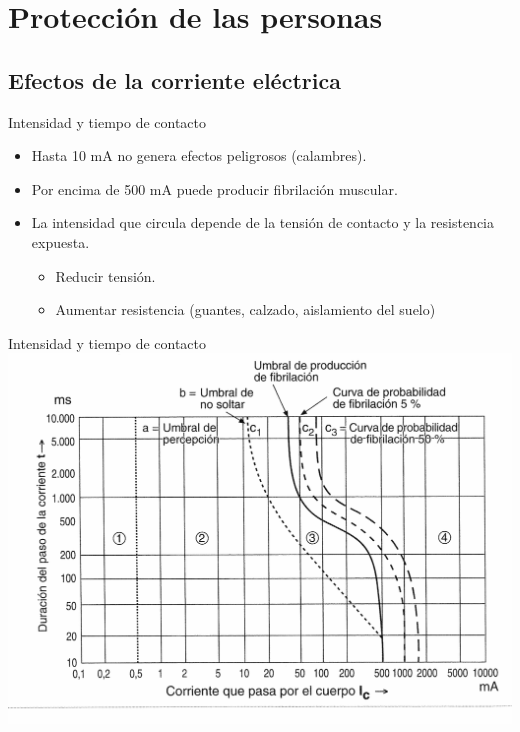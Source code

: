 \documentclass[xcolor={usenames,svgnames,dvipsnames}]{beamer}
\begin{document}
\section{Protección de las personas}
\label{sec-2}

\subsection{Efectos de la corriente eléctrica}
\label{sec-2-1}

\begin{frame}[label=sec-2-1-1]{Intensidad y tiempo de contacto}
\begin{itemize}
\item Hasta 10 mA no genera efectos peligrosos (calambres).

\item Por encima de 500 mA puede producir fibrilación muscular.

\item La \alert{intensidad} que circula \alert{depende de la tensión de contacto y la
resistencia expuesta}.

\begin{itemize}
\item Reducir tensión.

\item Aumentar resistencia (guantes, calzado, aislamiento del suelo)
\end{itemize}
\end{itemize}
\end{frame}

\begin{frame}[label=sec-2-1-2]{Intensidad y tiempo de contacto}
\includegraphics[width=.9\linewidth]{../figs/CurvaIntensidadContactoTiempo.pdf}
\end{frame}
\end{document}

